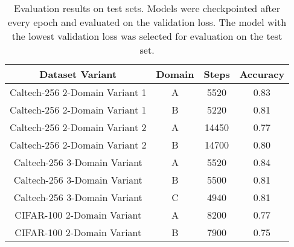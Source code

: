 \begin{table}[ht]
\centering
\caption{Evaluation results on test sets. Models were checkpointed after every epoch and evaluated on the validation loss. The model with the lowest validation loss was selected for evaluation on the test set.}
\label{tab:evaluation_results}
\begin{tabular}{cccc}
\toprule
Dataset Variant & Domain & Steps & Accuracy \\
\midrule
Caltech-256 2-Domain Variant 1 & A & 5520 & 0.83 \\
Caltech-256 2-Domain Variant 1 & B & 5220 & 0.81 \\
Caltech-256 2-Domain Variant 2 & A & 14450 & 0.77 \\
Caltech-256 2-Domain Variant 2 & B & 14700 & 0.80 \\
Caltech-256 3-Domain Variant & A & 5520 & 0.84 \\
Caltech-256 3-Domain Variant & B & 5500 & 0.81 \\
Caltech-256 3-Domain Variant & C & 4940 & 0.81 \\
CIFAR-100 2-Domain Variant & A & 8200 & 0.77 \\
CIFAR-100 2-Domain Variant & B & 7900 & 0.75 \\
\bottomrule
\end{tabular}
\end{table}
